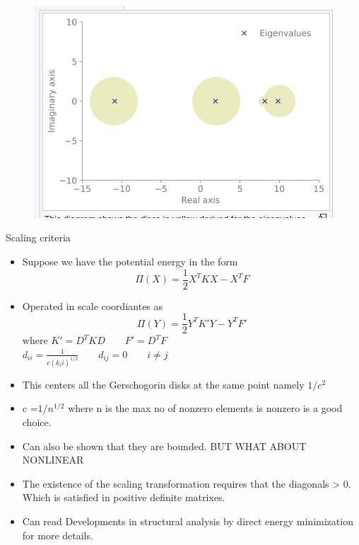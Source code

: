 	\begin{frame}
		\begin{figure}
			\centering
			\includegraphics[width=0.7\linewidth]{Figure/screenshot001}
			\caption{}
			\label{fig:screenshot001}
		\end{figure}
		
	\end{frame}

	\begin{frame}{Scaling criteria}
		\begin{itemize}
			\item Suppose we have the potential energy in the form 
			\begin{equation}
				\Pi(X) = \frac{1}{2} X^{T}KX - X^{T}F
			\end{equation}
			\item Operated in scale coordiantes as
			\begin{equation}
				\Pi(Y) = \frac{1}{2} Y^{T}K'Y - Y^{T}F'
			\end{equation}
			where $K'=D^{T}KD \qquad F' = D^{T}F$\\
			$d_{ii}=\frac{1}{c(k_ii)^{1/2}} \qquad d_{ij}=0 \qquad i \neq j$
			\item This centers all the Gerschogorin disks at the same point namely $1/c^{2}$
			\item c =$1/n^{1/2}$ where n is the max no of nonzero elements is nonzero is a good choice.
			\item Can also be shown that they are bounded. BUT WHAT ABOUT NONLINEAR
			\item The existence of the scaling transformation requires that the diagonals > 0. Which is satisfied in positive definite matrixes.
			\item Can read Developments in structural analysis by direct energy minimization for more details.
		\end{itemize}
	\end{frame}
